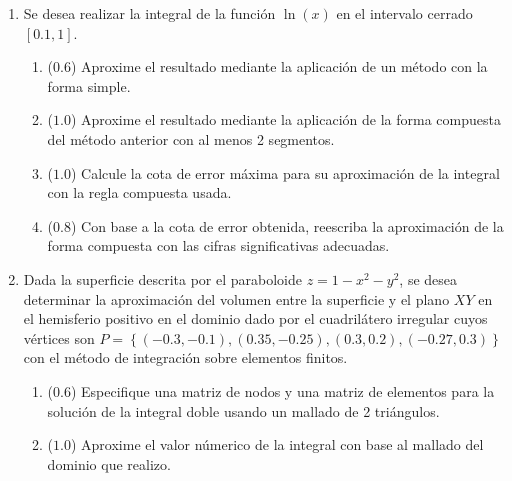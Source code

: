 \documentclass[12pt]{article}
\begin{document}
\vspace{-.5cm}
  \begin{enumerate}[leftmargin=*,widest=9]
    \item Se desea realizar la integral de la función \(\ln(x)\) en el intervalo cerrado \(\left[0.1, 1\right]\).
    \begin{enumerate}[label=\alph*]
    \item (\(0.6\)) Aproxime el resultado mediante la aplicación de un método con la forma simple.
\vspace{2cm}
    \item (\(1.0\)) Aproxime el resultado mediante la aplicación de la forma compuesta del método anterior con al menos 2 segmentos.
		\vspace{4cm}
    \item (\(1.0\)) Calcule la cota de error máxima para su aproximación de la integral con la regla compuesta usada.
		\vspace{3cm}
    \item (\(0.8\)) Con base a la cota de error obtenida, reescriba la aproximación de la forma compuesta con las cifras significativas adecuadas.
\vspace{2cm}
    \end{enumerate}
    \item Dada la superficie descrita por el paraboloide \(z=1- x^2 - y^2\), se desea determinar la aproximación del volumen entre la superficie y el plano \(XY\) en el hemisferio positivo en el dominio dado por el cuadrilátero irregular cuyos vértices son
    \(
    P = \left\lbrace (-0.3, -0.1), (0.35, -0.25), (0.3, 0.2), (-0.27, 0.3)\right\rbrace
    \)
    con el método de integración sobre elementos finitos.
    \begin{enumerate}[label=\alph*]
    \item (\(0.6\)) Especifique una matriz de nodos y una matriz de elementos para la solución de la integral doble usando un mallado de 2 triángulos.
	   \vspace{8cm}
    \item (\(1.0\)) Aproxime el valor númerico de la integral con base al mallado del dominio que realizo.
	 \vspace{8cm}
    \end{enumerate}
\end{enumerate}
\end{document}
